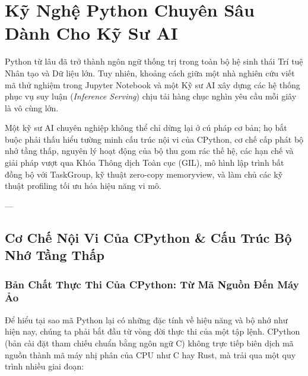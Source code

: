 
\chapter{Kỹ Nghệ Python Chuyên Sâu Dành Cho Kỹ Sư AI}
\label{ch:python-mastery}

Python từ lâu đã trở thành ngôn ngữ thống trị trong toàn bộ hệ sinh thái Trí tuệ Nhân tạo và Dữ liệu lớn. Tuy nhiên, khoảng cách giữa một nhà nghiên cứu viết mã thử nghiệm trong Jupyter Notebook và một Kỹ sư AI xây dựng các hệ thống phục vụ suy luận (\textit{Inference Serving}) chịu tải hàng chục nghìn yêu cầu mỗi giây là vô cùng lớn. 

Một kỹ sư AI chuyên nghiệp không thể chỉ dừng lại ở cú pháp cơ bản; họ bắt buộc phải thấu hiểu tường minh cấu trúc nội vi của CPython, cơ chế cấp phát bộ nhớ tầng thấp, nguyên lý hoạt động của bộ thu gom rác thế hệ, các hạn chế và giải pháp vượt qua Khóa Thông dịch Toàn cục (GIL), mô hình lập trình bất đồng bộ với TaskGroup, kỹ thuật zero-copy memoryview, và làm chủ các kỹ thuật profiling tối ưu hóa hiệu năng vi mô.

---

\section{Cơ Chế Nội Vi Của CPython \& Cấu Trúc Bộ Nhớ Tầng Thấp}
\label{sec:cpython-internals}

\subsection{Bản Chất Thực Thi Của CPython: Từ Mã Nguồn Đến Máy Ảo}

Để hiểu tại sao mã Python lại có những đặc tính về hiệu năng và bộ nhớ như hiện nay, chúng ta phải bắt đầu từ vòng đời thực thi của một tập lệnh. CPython (bản cài đặt tham chiếu chuẩn bằng ngôn ngữ C) không trực tiếp biên dịch mã nguồn thành mã máy nhị phân của CPU như C hay Rust, mà trải qua một quy trình nhiều giai đoạn:

